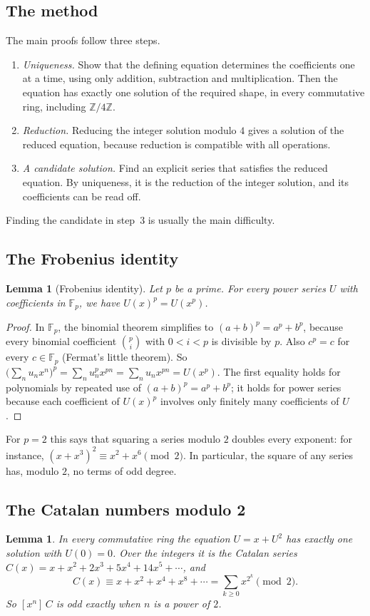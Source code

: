 \documentclass[11pt,a4paper]{article}
\newtheorem{lemma}[theorem]{Lemma}
\theoremstyle{definition}
\theoremstyle{remark}
\newcommand{\Z}{\mathbb{Z}}
\newcommand{\F}{\mathbb{F}}
\newcommand{\coeff}[2]{[x^{#1}]\,#2}
\begin{document}
\subsection{The method}
The main proofs follow three steps.
\begin{enumerate}
\item \emph{Uniqueness.} Show that the defining equation determines the coefficients one at a time, using only
addition, subtraction and multiplication. Then the equation has exactly one solution of the required shape, in every
commutative ring, including $\Z/4\Z$.
\item \emph{Reduction.} Reducing the integer solution modulo $4$ gives a solution of the reduced equation,
because reduction is compatible with all operations.
\item \emph{A candidate solution.} Find an explicit series that satisfies the reduced equation. By uniqueness, it is
the reduction of the integer solution, and its coefficients can be read off.
\end{enumerate}
Finding the candidate in step~3 is usually the main difficulty.
\subsection{The Frobenius identity}
\begin{lemma}[Frobenius identity]\label{lem:frobenius}
Let $p$ be a prime. For every power series $U$ with coefficients in $\F_p$, we have $U(x)^p=U(x^p)$.
\end{lemma}

\begin{proof}
In $\F_p$, the binomial theorem simplifies to $(a+b)^p=a^p+b^p$, because every binomial coefficient
$\binom pi$ with $0<i<p$ is divisible by $p$. Also $c^p=c$ for every $c\in\F_p$ (Fermat's little theorem). So
$\bigl(\sum_nu_nx^n\bigr)^p=\sum_nu_n^px^{pn}=\sum_nu_nx^{pn}=U(x^p)$. The first equality holds for polynomials by
repeated use of $(a+b)^p=a^p+b^p$; it holds for power series because each coefficient of $U(x)^p$ involves only finitely
many coefficients of $U$.
\end{proof}

For $p=2$ this says that squaring a series modulo $2$ doubles every exponent: for instance,
$(x+x^3)^2\equiv x^2+x^6\pmod2$. In particular, the square of any series has, modulo $2$, no terms of odd degree.

\subsection{The Catalan numbers modulo 2}
\begin{lemma}\label{lem:catalan}
In every commutative ring the equation $U=x+U^2$ has exactly one solution with $U(0)=0$. Over the integers it is the
Catalan series $C(x)=x+x^2+2x^3+5x^4+14x^5+\cdots$, and
\[
C(x)\equiv x+x^2+x^4+x^8+\cdots=\sum_{k\ge0}x^{2^k}\pmod 2 .
\]
So $\coeff{n}{C}$ is odd exactly when $n$ is a power of $2$.
\end{lemma}
\end{document}
